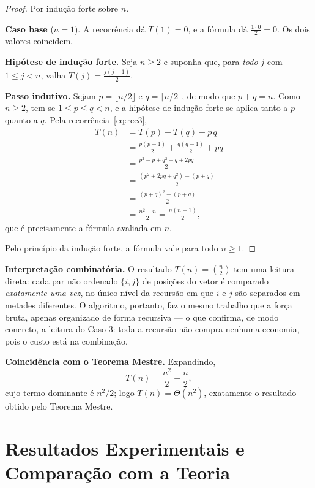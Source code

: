 \documentclass[11pt,a4paper]{article}
\begin{document}
\begin{proof}
Por indução forte sobre $n$.

\textbf{Caso base} ($n=1$). A recorrência dá $T(1)=0$, e a fórmula dá $\frac{1\cdot0}{2}=0$. Os dois valores coincidem.

\textbf{Hipótese de indução forte.} Seja $n\ge2$ e suponha que, para \emph{todo} $j$ com $1\le j<n$, valha $T(j)=\frac{j(j-1)}{2}$.

\textbf{Passo indutivo.} Sejam $p=\lfloor n/2\rfloor$ e $q=\lceil n/2\rceil$, de modo que $p+q=n$. Como $n\ge2$, tem-se $1\le p\le q<n$, e a hipótese de indução forte se aplica tanto a $p$ quanto a $q$. Pela recorrência~\eqref{eq:rec3},
\begin{align*}
T(n)&=T(p)+T(q)+p\,q\\
&=\frac{p(p-1)}{2}+\frac{q(q-1)}{2}+pq\\
&=\frac{p^2-p+q^2-q+2pq}{2}\\
&=\frac{(p^2+2pq+q^2)-(p+q)}{2}\\
&=\frac{(p+q)^2-(p+q)}{2}\\
&=\frac{n^2-n}{2}=\frac{n(n-1)}{2},
\end{align*}
que é precisamente a fórmula avaliada em $n$.

Pelo princípio da indução forte, a fórmula vale para todo $n\ge1$.
\end{proof}

\textbf{Interpretação combinatória.} O resultado $T(n)=\binom n2$ tem uma leitura direta: cada par não ordenado $\{i,j\}$ de posições do vetor é comparado \emph{exatamente uma vez}, no único nível da recursão em que $i$ e $j$ são separados em metades diferentes. O algoritmo, portanto, faz o mesmo trabalho que a força bruta, apenas organizado de forma recursiva --- o que confirma, de modo concreto, a leitura do Caso 3: toda a recursão não compra nenhuma economia, pois o custo está na combinação.

\textbf{Coincidência com o Teorema Mestre.} Expandindo,
\begin{equation}
T(n)=\frac{n^2}{2}-\frac n2,
\label{eq:fechada3}
\end{equation}
cujo termo dominante é $n^2/2$; logo $T(n)=\Theta(n^2)$, exatamente o resultado obtido pelo Teorema Mestre.

\section{Resultados Experimentais e Comparação com a Teoria}
\end{document}
